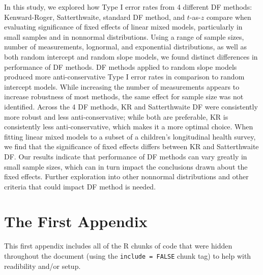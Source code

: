 \documentclass[12pt, twoside]{amherstthesis}
\begin{document}
In this study, we explored how Type I error rates from 4 different DF methods: Kenward-Roger, Satterthwaite, standard DF method, and \(t\)-as-\(z\) compare when evaluating significance of fixed effects of linear mixed models, particularly in small samples and in nonnormal distributions. Using a range of sample sizes, number of measurements, lognormal, and exponential distributions, as well as both random intercept and random slope models, we found distinct differences in performance of DF methods. DF methods applied to random slope models produced more anti-conservative Type I error rates in comparison to random intercept models. While increasing the number of measurements appears to increase robustness of most methods, the same effect for sample size was not identified. Across the 4 DF methods, KR and Satterthwaite DF were consistently more robust and less anti-conservative; while both are preferable, KR is consistently less anti-conservative, which makes it a more optimal choice. When fitting linear mixed models to a subset of a children's longitudinal health survey, we find that the significance of fixed effects differs between KR and Satterthwaite DF. Our results indicate that performance of DF methods can vary greatly in small sample sizes, which can in turn impact the conclusions drawn about the fixed effects. Further exploration into other nonnormal distributions and other criteria that could impact DF method is needed.

\appendix

\hypertarget{the-first-appendix}{%
\chapter{The First Appendix}\label{the-first-appendix}}

This first appendix includes all of the R chunks of code that were hidden throughout the document (using the \texttt{include\ =\ FALSE} chunk tag) to help with readibility and/or setup.
\end{document}
